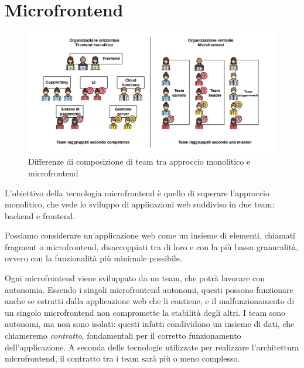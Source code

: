 \chapter{Microfrontend}\label{ch:chapter1}
\begin{figure}[H]
  \centering
  \includegraphics[width=140mm]{img/schema_microfrontend}
  \caption{Differenze di composizione di team tra approccio monolitico e microfrontend}
\end{figure}
L'obiettivo della tecnologia microfrontend è quello di superare l'approccio monolitico, che vede
lo sviluppo di applicazioni web suddiviso in due team: backend e frontend.

Possiamo considerare un'applicazione web come un insieme
di elementi, chiamati fragment o microfrontend, disaccoppiati tra di loro
e con la più bassa granuralità, ovvero con la funzionalità più minimale possibile.

Ogni microfrontend viene sviluppato da un team, che potrà lavorare con autonomia. 
Essendo i singoli microfrontend autonomi,
questi possono funzionare anche se estratti dalla applicazione web che li contiene,
 e il malfunzionamento di un singolo microfrontend
non compromette la stabilità degli altri.
I team sono autonomi, ma non sono isolati: questi infatti condividono un insieme di dati, che
chiameremo \emph{contratto},
fondamentali per il corretto funzionamento dell'applicazione. A seconda delle tecnologie utilizzate
per realizzare l'architettura microfrontend, il contratto tra i team sarà più o meno complesso.



